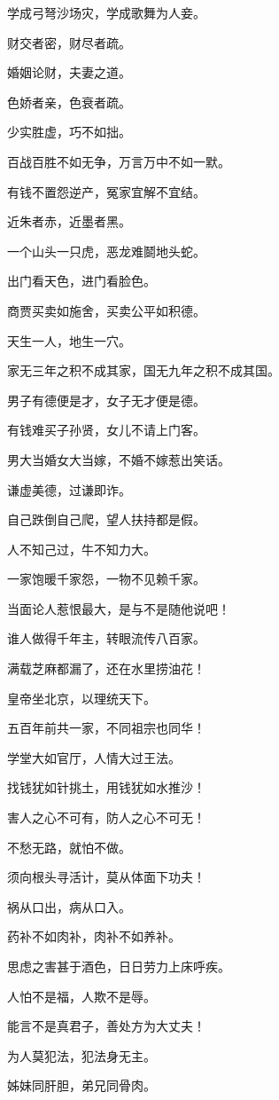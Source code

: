 \documentclass[12pt,oneside]{book}
\begin{document}
学成弓弩沙场灾，学成歌舞为人妾。

财交者密，财尽者疏。

婚姻论财，夫妻之道。

色娇者亲，色衰者疏。

少实胜虚，巧不如拙。

百战百胜不如无争，万言万中不如一默。

有钱不置怨逆产，冤家宜解不宜结。

近朱者赤，近墨者黑。

一个山头一只虎，恶龙难鬬地头蛇。

出门看天色，进门看脸色。

商贾买卖如施舍，买卖公平如积德。

天生一人，地生一穴。

家无三年之积不成其家，国无九年之积不成其国。

男子有德便是才，女子无才便是德。

有钱难买子孙贤，女儿不请上门客。

男大当婚女大当嫁，不婚不嫁惹出笑话。

谦虚美德，过谦即诈。

自己跌倒自己爬，望人扶持都是假。

人不知己过，牛不知力大。

一家饱暖千家怨，一物不见赖千家。

当面论人惹恨最大，是与不是随他说吧！

谁人做得千年主，转眼流传八百家。

满载芝麻都漏了，还在水里捞油花！

皇帝坐北京，以理统天下。

五百年前共一家，不同祖宗也同华！

学堂大如官厅，人情大过王法。

找钱犹如针挑土，用钱犹如水推沙！

害人之心不可有，防人之心不可无！

不愁无路，就怕不做。

须向根头寻活计，莫从体面下功夫！

祸从口出，病从口入。

药补不如肉补，肉补不如养补。

思虑之害甚于酒色，日日劳力上床呼疾。

人怕不是福，人欺不是辱。

能言不是真君子，善处方为大丈夫！

为人莫犯法，犯法身无主。

姊妹同肝胆，弟兄同骨肉。
\end{document}
